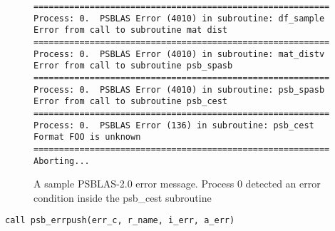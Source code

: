 \begin{figure}[h!]
  \begin{Sbox}
    \begin{minipage}[tl]{0.95\textwidth}
\begin{verbatim}
==========================================================
Process: 0.  PSBLAS Error (4010) in subroutine: df_sample           
Error from call to subroutine mat dist            
==========================================================
Process: 0.  PSBLAS Error (4010) in subroutine: mat_distv           
Error from call to subroutine psb_spasb           
==========================================================
Process: 0.  PSBLAS Error (4010) in subroutine: psb_spasb           
Error from call to subroutine psb_cest            
==========================================================
Process: 0.  PSBLAS Error (136) in subroutine: psb_cest            
Format FOO is unknown
==========================================================
Aborting...
\end{verbatim}
    \end{minipage}
  \end{Sbox}
  \setlength{\fboxsep}{8pt}
  \begin{center}
    \fbox{\TheSbox}
  \end{center}
  \caption{\label{fig:errormsg}A sample PSBLAS-2.0 error
    message. Process 0 detected an error condition inside the {\textrm
    psb\_cest} subroutine}
\end{figure}


\clearpage{}

\begin{lstlisting}
call psb_errpush(err_c, r_name, i_err, a_err)
\end{lstlisting}

